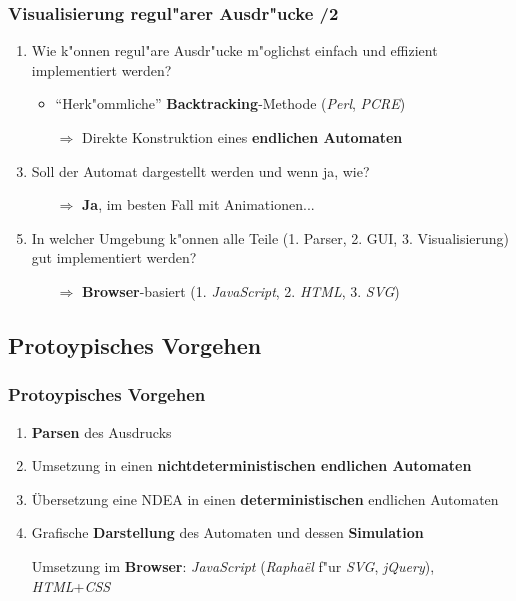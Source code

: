 \documentclass[ignorenonframetext]{beamer}
\begin{document}
\begin{frame}
    \frametitle{Visualisierung regul"arer Ausdr"ucke /2}

	\begin{enumerate}
		\item Wie k"onnen regul"are Ausdr"ucke m"oglichst einfach und effizient implementiert werden?
		\begin{itemize}
			\item ``Herk"ommliche'' \textbf{Backtracking}-Methode (\textit{Perl}, \textit{PCRE})
			\item[$\Rightarrow$] Direkte Konstruktion eines \textbf{endlichen Automaten}
		\end{itemize}
        \item[]
        \item Soll der Automat dargestellt werden und wenn ja, wie?
        \begin{itemize}
            \item[$\Rightarrow$] \textbf{Ja}, im besten Fall mit Animationen...
        \end{itemize}
        \item[]
        \item In welcher Umgebung k"onnen alle Teile (1. Parser, 2. GUI, 3. Visualisierung) gut implementiert werden?
        \begin{itemize}
            \item[$\Rightarrow$] \textbf{Browser}-basiert (1. \textit{JavaScript}, 2. \textit{HTML}, 3. \textit{SVG})
        \end{itemize}
	\end{enumerate}
\end{frame}


\subsection{Protoypisches Vorgehen}
\begin{frame}
    \frametitle{Protoypisches Vorgehen}
	
	\begin{enumerate}
		\item \textbf{Parsen} des Ausdrucks
		\item Umsetzung in einen \textbf{nichtdeterministischen endlichen Automaten}
		\item Übersetzung eine NDEA in einen \textbf{deterministischen} endlichen Automaten
		\item Grafische \textbf{Darstellung} des Automaten und dessen \textbf{Simulation}
		\item[]
		\item[] Umsetzung im \textbf{Browser}: \textit{JavaScript} (\textit{Rapha\"el} f"ur \textit{SVG}, \textit{jQuery}), \textit{HTML}+\textit{CSS}
	\end{enumerate}
\end{frame}
\end{document}
